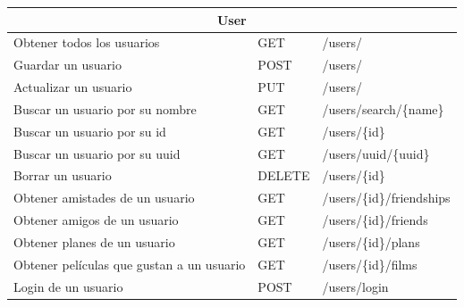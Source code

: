 \begin{center}
    \begin{tabularx}{1\textwidth}{@{\extracolsep{\fill}} | l | l | X |} \hline
    \multicolumn{3}{|c|}{User} \\ \hline
    Obtener todos los usuarios & GET & /users/ \\ \hline
    Guardar un usuario & POST & /users/ \\ \hline
    Actualizar un usuario & PUT & /users/ \\ \hline
    Buscar un usuario por su nombre & GET & /users/search/\{name\} \\ \hline
    Buscar un usuario por su id & GET & /users/\{id\} \\ \hline
    Buscar un usuario por su uuid & GET & /users/uuid/\{uuid\} \\ \hline
    Borrar un usuario & DELETE & /users/\{id\} \\ \hline
    Obtener amistades de un usuario & GET & /users/\{id\}/friendships \\ \hline
    Obtener amigos de un usuario & GET & /users/\{id\}/friends \\ \hline
    Obtener planes de un usuario & GET & /users/\{id\}/plans \\ \hline
    Obtener películas que gustan a un usuario & GET & /users/\{id\}/films \\ \hline
    Login de un usuario & POST & /users/login \\ \hline
    \end{tabularx}
\end{center}

